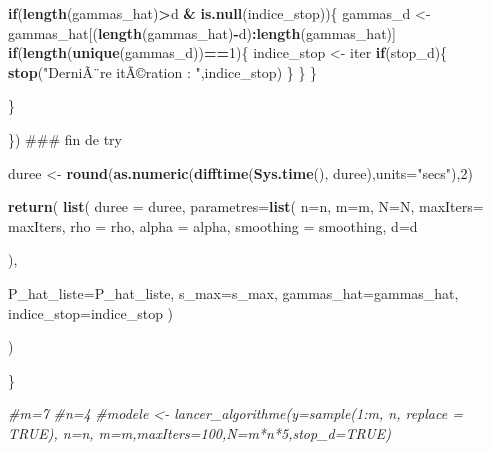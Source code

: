 \documentclass[]{article}
\newenvironment{Shaded}{\begin{snugshade}}{\end{snugshade}}
\newcommand{\CommentTok}[1]{\textcolor[rgb]{0.56,0.35,0.01}{\textit{#1}}}
\newcommand{\ControlFlowTok}[1]{\textcolor[rgb]{0.13,0.29,0.53}{\textbf{#1}}}
\newcommand{\DataTypeTok}[1]{\textcolor[rgb]{0.13,0.29,0.53}{#1}}
\newcommand{\DecValTok}[1]{\textcolor[rgb]{0.00,0.00,0.81}{#1}}
\newcommand{\KeywordTok}[1]{\textcolor[rgb]{0.13,0.29,0.53}{\textbf{#1}}}
\newcommand{\NormalTok}[1]{#1}
\newcommand{\OperatorTok}[1]{\textcolor[rgb]{0.81,0.36,0.00}{\textbf{#1}}}
\newcommand{\StringTok}[1]{\textcolor[rgb]{0.31,0.60,0.02}{#1}}
\begin{document}
\begin{Shaded}
\begin{Highlighting}[]
      \ControlFlowTok{if}\NormalTok{(}\KeywordTok{length}\NormalTok{(gammas_hat)}\OperatorTok{>}\NormalTok{d }\OperatorTok{&}\StringTok{ }\KeywordTok{is.null}\NormalTok{(indice_stop))\{}
\NormalTok{        gammas_d <-}\StringTok{ }\NormalTok{gammas_hat[(}\KeywordTok{length}\NormalTok{(gammas_hat)}\OperatorTok{-}\NormalTok{d)}\OperatorTok{:}\KeywordTok{length}\NormalTok{(gammas_hat)]}
        \ControlFlowTok{if}\NormalTok{(}\KeywordTok{length}\NormalTok{(}\KeywordTok{unique}\NormalTok{(gammas_d))}\OperatorTok{==}\DecValTok{1}\NormalTok{)\{}
\NormalTok{          indice_stop <-}\StringTok{ }\NormalTok{iter}
          \ControlFlowTok{if}\NormalTok{(stop_d)\{}
            \KeywordTok{stop}\NormalTok{(}\StringTok{"DerniÃ¨re itÃ©ration : "}\NormalTok{,indice_stop)  }
\NormalTok{          \}}
\NormalTok{        \}}
\NormalTok{      \}}
      
\NormalTok{    \}}
    
    
\NormalTok{  \})}
\NormalTok{  ### fin de try}
  
\NormalTok{  duree <-}\StringTok{ }\KeywordTok{round}\NormalTok{(}\KeywordTok{as.numeric}\NormalTok{(}\KeywordTok{difftime}\NormalTok{(}\KeywordTok{Sys.time}\NormalTok{(), duree),}\DataTypeTok{units=}\StringTok{"secs"}\NormalTok{),}\DecValTok{2}\NormalTok{)}
  
  
  \KeywordTok{return}\NormalTok{(}
    \KeywordTok{list}\NormalTok{(}
      \DataTypeTok{duree =}\NormalTok{ duree,}
      \DataTypeTok{parametres=}\KeywordTok{list}\NormalTok{(}
        \DataTypeTok{n=}\NormalTok{n,}
        \DataTypeTok{m=}\NormalTok{m,}
        \DataTypeTok{N=}\NormalTok{N,}
        \DataTypeTok{maxIters=}\NormalTok{ maxIters,}
        \DataTypeTok{rho =}\NormalTok{ rho,}
        \DataTypeTok{alpha =}\NormalTok{ alpha,}
        \DataTypeTok{smoothing =}\NormalTok{ smoothing,}
        \DataTypeTok{d=}\NormalTok{d}
        
\NormalTok{      ),}
      
      
      \DataTypeTok{P_hat_liste=}\NormalTok{P_hat_liste,}
      \DataTypeTok{s_max=}\NormalTok{s_max,}
      \DataTypeTok{gammas_hat=}\NormalTok{gammas_hat,}
      \DataTypeTok{indice_stop=}\NormalTok{indice_stop}
\NormalTok{    )}
  
\NormalTok{  )}

  
\NormalTok{\}}

\CommentTok{#m=7}
\CommentTok{#n=4}
\CommentTok{#modele <- lancer_algorithme(y=sample(1:m, n, replace = TRUE), n=n, m=m,maxIters=100,N=m*n*5,stop_d=TRUE)}



\end{Highlighting}
\end{Shaded}
\end{document}
